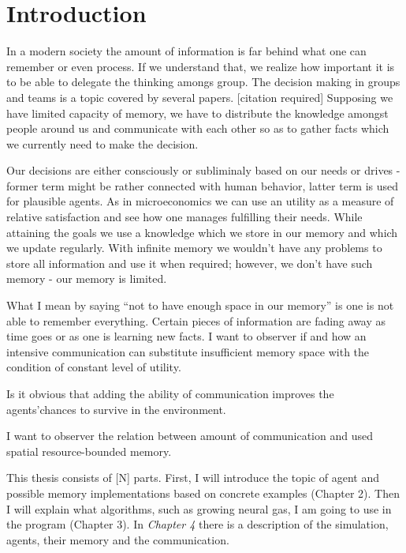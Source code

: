 \chapter{Introduction}

In a modern society the amount of information is far behind what one can remember or even process. If we understand that, we realize how important it is to be able to delegate the thinking amongs group. The decision making in groups and teams is a topic covered by several papers. [citation required] Supposing we have limited capacity of memory, we have to distribute the knowledge amongst people around us and communicate with each other so as to gather facts which we currently need to make the decision. 

Our decisions are either consciously or subliminaly based on our needs or drives - former term might be rather connected with human behavior, latter term is used for plausible agents. As in microeconomics we can use an utility as a measure of relative satisfaction \cite{Varian:micro} and see how one manages fulfilling their needs. While attaining the goals we use a knowledge which we store in our memory and which we update regularly. With infinite memory we wouldn’t have any problems to store all information and use it when required; however, we don’t have such memory - our memory is limited. 

What I mean by saying “not to have enough space in our memory” is one is not able to remember everything. Certain pieces of information are fading away as time goes or as one is learning new facts. I want to observer if and how an intensive communication can substitute insufficient memory space with the condition of constant level of utility.

Is it obvious that adding the ability of communication improves the agents'chances to survive in the environment.

I want to observer the relation between amount of communication and used spatial resource-bounded memory. 

This thesis consists of [N] parts. First, I will introduce the topic of agent and possible memory implementations based on concrete examples (Chapter 2). Then I will explain what algorithms, such as growing neural gas, I am going to use in the program (Chapter 3). In \emph{Chapter 4} there is a description of the simulation, agents, their memory and the communication.